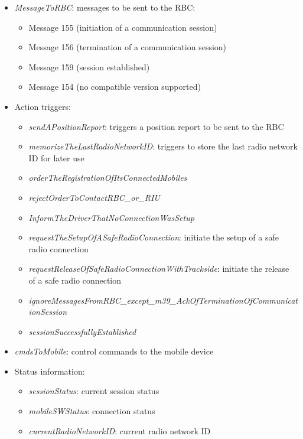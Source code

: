 \begin{itemize}

 \item \textit{MessageToRBC}: messages to be sent to the RBC: 

  \begin{itemize}
   \item Message 155 (initiation of a communication session)
   \item Message 156 (termination of a communication session)
   \item Message 159 (session established)
   \item Message 154 (no compatible version supported) 
  \end{itemize}

 \item Action triggers: 
 
  \begin{itemize}
   \item \textit{sendAPositionReport}: triggers a position report to be sent to the RBC
   \item \textit{memorizeTheLastRadioNetworkID}: triggers to store the last radio network ID for later use
   \item \textit{orderTheRegistrationOfItsConnectedMobiles}
   \item \textit{rejectOrderToContactRBC\_or\_RIU}
   \item \textit{InformTheDriverThatNoConnectionWasSetup}
   \item \textit{requestTheSetupOfASafeRadioConnection}: initiate the setup of a safe radio connection
   \item \textit{requestReleaseOfSafeRadioConnectionWithTrackside}: initiate the release of a safe radio connection
   \item \textit{ignoreMessagesFromRBC\_except\_m39\_AckOfTerminationOfCommunicationSession}
   \item \textit{sessionSuccessfullyEstablished}
  \end{itemize} 

 \item \textit{cmdsToMobile}: control commands to the mobile device
 
 \item Status information: 
 
  \begin{itemize}
   \item \textit{sessionStatus}: current session status
   \item \textit{mobileSWStatus}: connection status
   \item \textit{currentRadioNetworkID}: current radio network ID
  \end{itemize}
 
\end{itemize}

